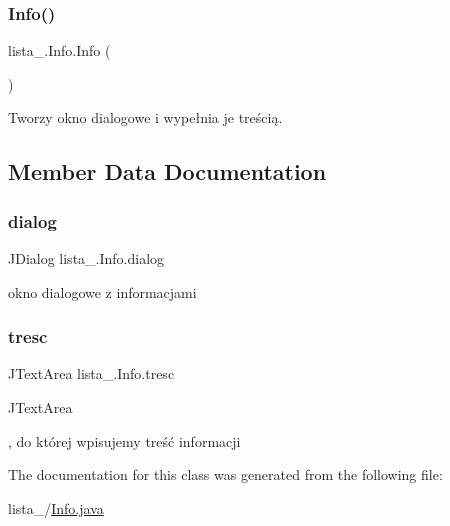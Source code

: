 \subsubsection{\texorpdfstring{Info()}{Info()}}
{\footnotesize\ttfamily lista\+\_.\+Info.\+Info (\begin{DoxyParamCaption}{ }\end{DoxyParamCaption})}

Tworzy okno dialogowe i wypełnia je treścią. 

\subsection{Member Data Documentation}
\mbox{\label{classlista__5_1_1_info_a130163346a8f8eabc00532453d238e4a}} 
\subsubsection{\texorpdfstring{dialog}{dialog}}
{\footnotesize\ttfamily J\+Dialog lista\+\_.\+Info.\+dialog\hspace{0.3cm}{\ttfamily [private]}}

okno dialogowe z informacjami \mbox{\label{classlista__5_1_1_info_aef87a771dccda7ab0c438b53904a21e6}} 
\subsubsection{\texorpdfstring{tresc}{tresc}}
{\footnotesize\ttfamily J\+Text\+Area lista\+\_.\+Info.\+tresc\hspace{0.3cm}{\ttfamily [private]}}


\begin{DoxyCode}
JTextArea 
\end{DoxyCode}
 , do której wpisujemy treść informacji 

The documentation for this class was generated from the following file\+:\begin{DoxyCompactItemize}
\item 
lista\+\_/\mbox{\hyperlink{_info_8java}{Info.\+java}}\end{DoxyCompactItemize}
